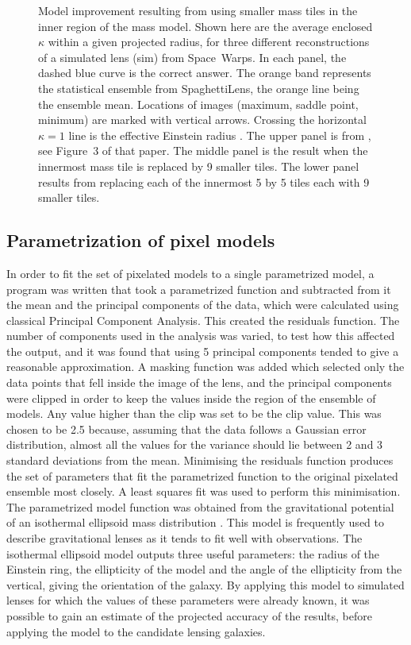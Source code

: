 \begin{figure}
  \caption{Model improvement resulting from using smaller mass tiles
    in the inner region of the mass model.  Shown here are the average
    enclosed $\kappa$ within a given projected radius, for three
    different reconstructions of a simulated lens (sim) from
    Space~Warps.  In each panel, the dashed blue curve is the correct
    answer.  The orange band represents the statistical ensemble from
    SpaghettiLens, the orange line being the ensemble mean.  Locations of
    images (maximum, saddle point, minimum) are marked with vertical
    arrows.  Crossing the horizontal $\kappa=1$ line is the effective
    Einstein radius \ER. The upper panel is from
    \citet{2015MNRAS.447.2170K}, see Figure~3 of that paper.  The middle
    panel is the result when the innermost mass tile is replaced by 9
    smaller tiles.  The lower panel results from replacing each of the
    innermost 5 by 5 tiles each with 9 smaller tiles.}
  \label{fig:subsampling}
\end{figure}

\subsection{Parametrization of pixel models} \label{subsec:parameter}

In order to fit the set of pixelated models to a single parametrized model, a 
program was written that took a parametrized function and subtracted from it 
the mean and the principal components of the data, which were calculated 
using 
classical Principal Component Analysis.
This created the residuals function.
The number of components used in the analysis was varied, to test how this 
affected the output, and it was found that using 5 principal components 
tended 
to give a reasonable approximation.
A masking function was added which selected only the data points that fell 
inside the image of the lens, and the principal components were clipped in 
order to keep the values inside the region of the ensemble of models.
Any value higher than the clip was set to be the clip value.
This was chosen to be 2.5 because, assuming that the data follows a Gaussian 
error 
distribution, almost all the values for the variance should lie between 2 and 
3 
standard deviations from the mean.
Minimising the residuals function produces the set of parameters that fit the 
parametrized function to the original pixelated ensemble most closely.
A least squares fit was used to perform this minimisation.
The parametrized model function was obtained from the gravitational potential 
of an isothermal ellipsoid mass distribution \citep{2001astro.ph..2341K}.
This model is frequently used to describe gravitational lenses as it tends to 
fit well with observations.
The isothermal ellipsoid model outputs three useful parameters: the radius of 
the Einstein ring, the ellipticity of the model and the angle of the 
ellipticity from the vertical, giving the orientation of the galaxy.
By applying this model to simulated lenses for which the values of these 
parameters were already known, it was possible to gain an estimate of the 
projected accuracy of the results, before applying the model to the candidate 
lensing galaxies.


